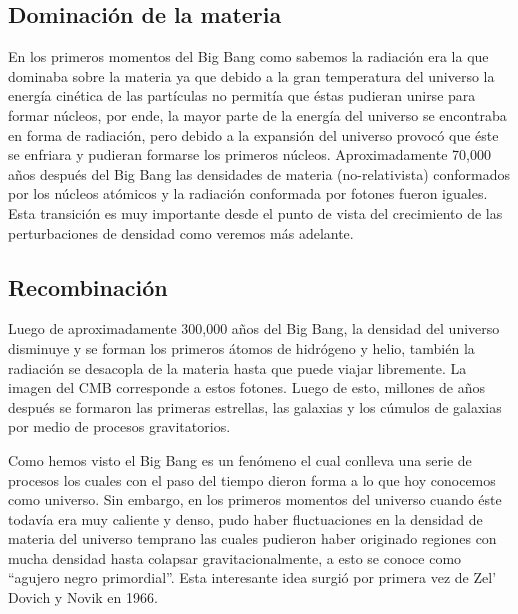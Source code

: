 \documentclass{article}
\begin{document}
\subsection*{Dominaci\'on de la materia}
En los primeros momentos del Big Bang como sabemos la radiaci\'on era la que dominaba sobre la materia ya que debido a la gran temperatura del universo la energ\'ia cin\'etica de las part\'iculas no permit\'ia que \'estas pudieran unirse para formar n\'ucleos, por ende, la mayor parte de la energ\'ia del universo se encontraba en forma de radiaci\'on, pero debido a la expansi\'on del universo provoc\'o que \'este se enfriara y pudieran formarse los primeros n\'ucleos. Aproximadamente 70,000 a\~nos despu\'es del Big Bang las densidades de materia (no-relativista) conformados por los n\'ucleos at\'omicos y la radiaci\'on conformada por fotones fueron iguales. Esta transici\'on es muy importante desde el punto de vista del crecimiento de las perturbaciones de densidad como veremos m\'as adelante.

\subsection*{Recombinaci\'on}
Luego de aproximadamente 300,000 a\~nos del Big Bang, la densidad del universo disminuye y se forman los primeros \'atomos de hidr\'ogeno y helio, tambi\'en la radiaci\'on se desacopla de la materia hasta que puede viajar libremente. La imagen del CMB corresponde a estos fotones.
Luego de esto, millones de a\~nos despu\'es se formaron las primeras estrellas, las galaxias y los c\'umulos de galaxias por medio de procesos gravitatorios.

Como hemos visto el Big Bang es un fen\'omeno el cual conlleva una serie de procesos los cuales con el paso del tiempo dieron forma a lo que hoy conocemos como universo. Sin embargo, en los primeros momentos del universo cuando \'este todav\'ia era muy caliente y denso, pudo haber fluctuaciones en la densidad de materia del universo temprano las cuales pudieron haber originado regiones con mucha densidad hasta colapsar gravitacionalmente, a esto se conoce como ``agujero negro primordial''. Esta interesante idea surgi\'o por primera vez de Zel' Dovich y Novik en 1966. 
\end{document}
